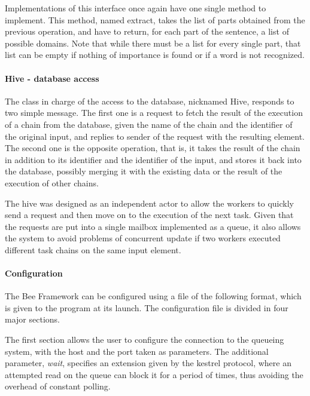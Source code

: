 Implementations of this interface once again have one single method to implement. This method, named extract, takes the list of parts obtained from the previous operation, and have to return, for each part of the sentence, a list of possible domains. Note that while there must be a list for every single part, that list can be empty if nothing of importance is found or if a word is not recognized.



\paragraph{Hive - database access} %
\label{par:hive_database_access}

The class in charge of the access to the database, nicknamed Hive, responds to two simple message. The first one is a request to fetch the result of the execution of a chain from the database, given the name of the chain and the identifier of the original input, and replies to sender of the request with the resulting element. The second one is the opposite operation, that is, it takes the result of the chain in addition to its identifier and the identifier of the input, and stores it back into the database, possibly merging it with the existing data or the result of the execution of other chains.

The hive was designed as an independent actor to allow the workers to quickly send a request and then move on to the execution of the next task. Given that the requests are put into a single mailbox implemented as a queue, it also allows the system to avoid problems of concurrent update if two workers executed different task chains on the same input element.


\paragraph{Configuration} %
\label{par:configuration}

The Bee Framework can be configured using a file of the following format, which is given to the program at its launch. The configuration file is divided in four major sections.

The first section allows the user to configure the connection to the queueing system, with the host and the port taken as parameters. The additional parameter, \emph{wait}, specifies an extension given by the kestrel protocol, where an attempted read on the queue can block it for a period of times, thus avoiding the overhead of constant polling.

